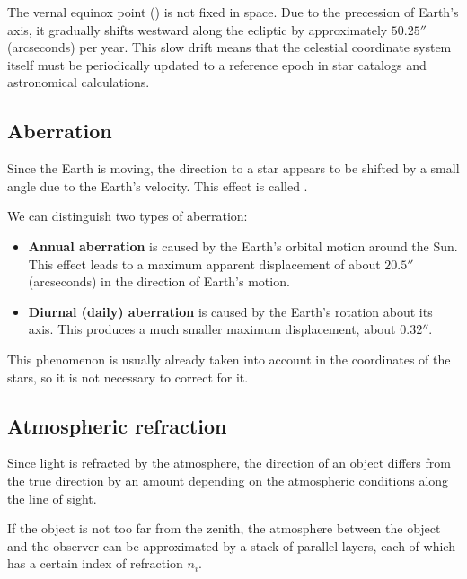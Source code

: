 \begin{observationblock}
    The vernal equinox point (\Aries) is not fixed in space. Due to the precession of Earth's axis, it gradually shifts westward along the ecliptic by approximately $50.25''$ (arcseconds) per year. This slow drift means that the celestial coordinate system itself must be periodically updated to a reference epoch in star catalogs and astronomical calculations.
\end{observationblock}

\subsection{Aberration}

Since the Earth is moving, the direction to a star appears to be shifted by a small angle due to the Earth's velocity. This effect is called .

We can distinguish two types of aberration:

\begin{itemize}
    \item \textbf{Annual aberration} is caused by the Earth's orbital motion around the Sun. This effect leads to a maximum apparent displacement of about $20.5''$ (arcseconds) in the direction of Earth's motion.
    \item \textbf{Diurnal (daily) aberration} is caused by the Earth's rotation about its axis. This produces a much smaller maximum displacement, about $0.32''$.
\end{itemize}

This phenomenon is usually already taken into account in the coordinates of the stars, so it is not necessary to correct for it.

\subsection{Atmospheric refraction}

Since light is refracted by the atmosphere, the direction of an object differs from the true direction by an amount depending on the atmospheric conditions along the line of sight.

If the object is not too far from the zenith, the atmosphere between the object and the observer can be approximated by a stack of parallel layers, each of which has a certain index of refraction $n_i$.

\vspace{0.3em}

